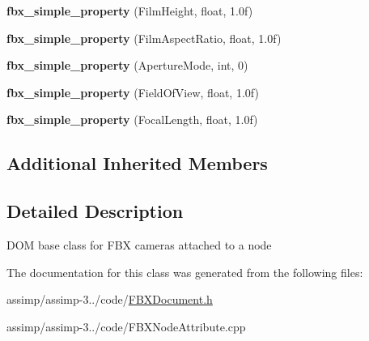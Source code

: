 \begin{DoxyCompactItemize}
\item 
\hypertarget{class_assimp_1_1_f_b_x_1_1_camera_a0a1465fb3a424a989cdbcf9913dd3279}{{\bfseries fbx\+\_\+simple\+\_\+property} (Film\+Height, float, 1.\+0f)}\label{class_assimp_1_1_f_b_x_1_1_camera_a0a1465fb3a424a989cdbcf9913dd3279}

\item 
\hypertarget{class_assimp_1_1_f_b_x_1_1_camera_a0c22fa670bf71fb7601150ac67dda344}{{\bfseries fbx\+\_\+simple\+\_\+property} (Film\+Aspect\+Ratio, float, 1.\+0f)}\label{class_assimp_1_1_f_b_x_1_1_camera_a0c22fa670bf71fb7601150ac67dda344}

\item 
\hypertarget{class_assimp_1_1_f_b_x_1_1_camera_a046146118133fef32663bcebd76d9dc8}{{\bfseries fbx\+\_\+simple\+\_\+property} (Aperture\+Mode, int, 0)}\label{class_assimp_1_1_f_b_x_1_1_camera_a046146118133fef32663bcebd76d9dc8}

\item 
\hypertarget{class_assimp_1_1_f_b_x_1_1_camera_ab3aaa526d7439a0d93061c04d9d07d5a}{{\bfseries fbx\+\_\+simple\+\_\+property} (Field\+Of\+View, float, 1.\+0f)}\label{class_assimp_1_1_f_b_x_1_1_camera_ab3aaa526d7439a0d93061c04d9d07d5a}

\item 
\hypertarget{class_assimp_1_1_f_b_x_1_1_camera_a7a438e8c93c5c2a0403dae971ae79eb6}{{\bfseries fbx\+\_\+simple\+\_\+property} (Focal\+Length, float, 1.\+0f)}\label{class_assimp_1_1_f_b_x_1_1_camera_a7a438e8c93c5c2a0403dae971ae79eb6}

\end{DoxyCompactItemize}
\subsection*{Additional Inherited Members}


\subsection{Detailed Description}
D\+O\+M base class for F\+B\+X cameras attached to a node 

The documentation for this class was generated from the following files\+:\begin{DoxyCompactItemize}
\item 
assimp/assimp-\/3../code/\hyperlink{_f_b_x_document_8h}{F\+B\+X\+Document.\+h}\item 
assimp/assimp-\/3../code/F\+B\+X\+Node\+Attribute.\+cpp\end{DoxyCompactItemize}

